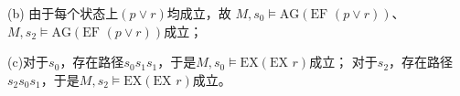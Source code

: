 \begin{solution}
    (b) 由于每个状态上$(p\vee r)$均成立，故
    $M,s_0\models \textrm{AG}(\textrm{EF }(p\vee r))$、
    $M,s_2\models \textrm{AG}(\textrm{EF }(p\vee r))$成立；
    
    (c)对于$s_0$，存在路径$s_0s_1s_1$，于是$M,s_0\models \textrm{EX}(\textrm{EX }r)$成立；
    对于$s_2$，存在路径$s_2s_0s_1$，于是$M,s_2\models \textrm{EX}(\textrm{EX }r)$成立。
\end{solution}